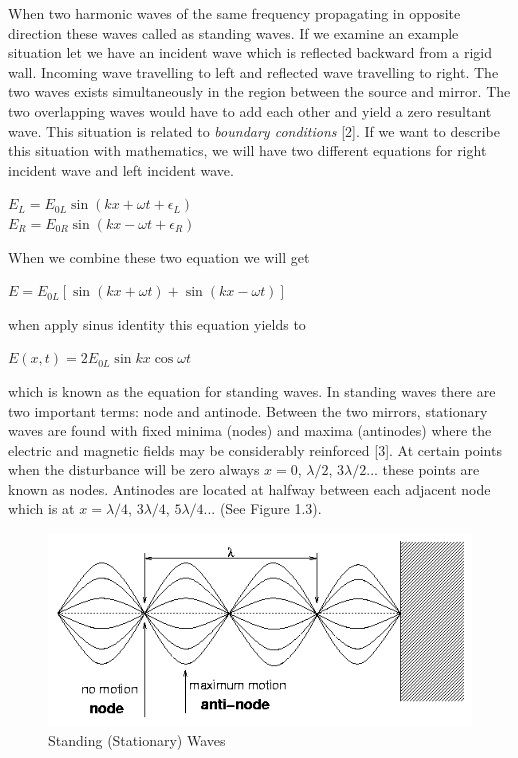 \documentclass[a4paper,12pt]{report}
\begin{document}
When two harmonic waves of the same frequency propagating in opposite direction these waves called as standing waves. If we examine an example situation let we have an incident wave which is reflected backward from a rigid wall. Incoming wave travelling to left and reflected wave travelling to right. The two waves exists simultaneously in the region between the source and mirror. The two overlapping waves would have to add each other and yield a zero resultant wave. This situation is related to \textit{boundary conditions} [2]. If we want to describe this situation with mathematics, we will have two different equations for right incident wave and left incident wave.
\begin{center}
	$E_{L}=E_{0L}\sin(kx+\omega t+\epsilon_{L})$\\
$E_{R}=E_{0R}\sin(kx-\omega t+\epsilon_{R})$
\end{center}
When we combine these two equation we will get
\begin{center}
	$E=E_{0L}[\sin(kx+\omega t)+\sin(kx-\omega t)]$
\end{center}
when apply sinus identity this equation yields to 
\begin{center}
	$E(x,t)=2E_{0L}\sin kx \cos \omega t$
\end{center}
which is known as the equation for standing waves. In standing waves there are two important terms: node and antinode. Between the two mirrors, stationary waves are found with fixed minima
(nodes) and maxima (antinodes) where the electric and magnetic fields may
be considerably reinforced [3]. At certain points when the disturbance will be zero always  $x=0$, $\lambda/2$, $3\lambda/2$... these points are known as nodes. Antinodes are located at halfway between each adjacent node which is at $x=\lambda/4$, $ 3 \lambda/4$, $5 \lambda/4$...
(See Figure 1.3).
\begin{figure}[h]
\centering
\includegraphics[width=0.85\linewidth, height=0.21\textheight]{standing2}
\caption{Standing (Stationary) Waves}
\label{fig:standing2}
\end{figure}
\end{document}
